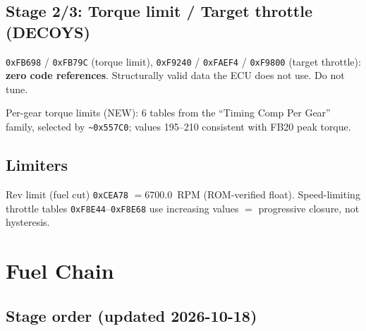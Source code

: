 \documentclass[11pt,a4paper]{book}
\begin{document}
\section{Stage 2/3: Torque limit / Target throttle (DECOYS)}

\texttt{0xFB698} / \texttt{0xFB79C} (torque limit), \texttt{0xF9240} /
\texttt{0xFAEF4} / \texttt{0xF9800} (target throttle): \textbf{zero code
references}. Structurally valid data the ECU does not use. Do not tune.

Per-gear torque limits (NEW): 6 tables from the ``Timing Comp Per Gear''
family, selected by \texttt{\textasciitilde0x557C0}; values 195--210
consistent with FB20 peak torque.

\section{Limiters}

Rev limit (fuel cut) \texttt{0xCEA78} $= 6700.0$~RPM (ROM-verified float).
Speed-limiting throttle tables \texttt{0xF8E44}--\texttt{0xF8E68} use
increasing values $=$ progressive closure, not hysteresis.

\chapter{Fuel Chain}

\section{Stage order (updated 2026-10-18)}
\end{document}
